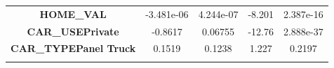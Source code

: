 \documentclass[]{article}
\begin{document}
\begin{longtable}[]{@{}ccccc@{}}
\begin{minipage}[t]{0.33\columnwidth}\centering\strut
\textbf{HOME\_VAL}\strut
\end{minipage} & \begin{minipage}[t]{0.14\columnwidth}\centering\strut
-3.481e-06\strut
\end{minipage} & \begin{minipage}[t]{0.14\columnwidth}\centering\strut
4.244e-07\strut
\end{minipage} & \begin{minipage}[t]{0.11\columnwidth}\centering\strut
-8.201\strut
\end{minipage} & \begin{minipage}[t]{0.12\columnwidth}\centering\strut
2.387e-16\strut
\end{minipage}\tabularnewline
\begin{minipage}[t]{0.33\columnwidth}\centering\strut
\textbf{CAR\_USEPrivate}\strut
\end{minipage} & \begin{minipage}[t]{0.14\columnwidth}\centering\strut
-0.8617\strut
\end{minipage} & \begin{minipage}[t]{0.14\columnwidth}\centering\strut
0.06755\strut
\end{minipage} & \begin{minipage}[t]{0.11\columnwidth}\centering\strut
-12.76\strut
\end{minipage} & \begin{minipage}[t]{0.12\columnwidth}\centering\strut
2.888e-37\strut
\end{minipage}\tabularnewline
\begin{minipage}[t]{0.33\columnwidth}\centering\strut
\textbf{CAR\_TYPEPanel Truck}\strut
\end{minipage} & \begin{minipage}[t]{0.14\columnwidth}\centering\strut
0.1519\strut
\end{minipage} & \begin{minipage}[t]{0.14\columnwidth}\centering\strut
0.1238\strut
\end{minipage} & \begin{minipage}[t]{0.11\columnwidth}\centering\strut
1.227\strut
\end{minipage} & \begin{minipage}[t]{0.12\columnwidth}\centering\strut
0.2197\strut
\end{minipage}\tabularnewline
\begin{minipage}[t]{0.33\columnwidth}\centering\strut

\end{minipage}
\end{longtable}
\end{document}
